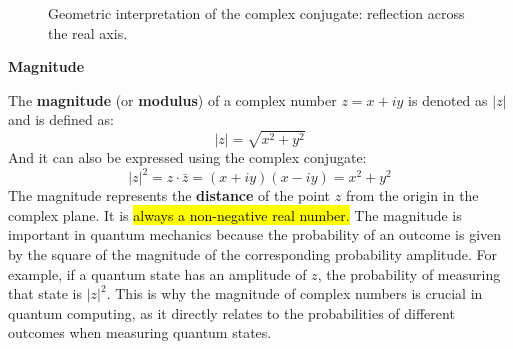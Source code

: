 \begin{figure}[!htp]
    \centering
    \caption{Geometric interpretation of the complex conjugate: reflection across the real axis.}
    \label{fig:complex-conjugate}
\end{figure}

\begin{flushleft}
    \textcolor{Green3}{ \textbf{Magnitude}}\label{sec:magnitude}
\end{flushleft}
The \textbf{magnitude} (or \textbf{modulus}) of a complex number $z = x + iy$ is denoted as $\left|z\right|$ and is defined as:
\begin{equation*}
    \left|z\right| = \sqrt{x^2 + y^2}
\end{equation*}
And it can also be expressed using the complex conjugate:
\begin{equation*}
    \left|z\right|^2 = z \cdot \bar{z} = (x + iy)(x - iy) = x^2 + y^2
\end{equation*}
The magnitude represents the \textbf{distance} of the point $z$ from the origin in the complex plane. It is \hl{always a non-negative real number.} The magnitude is important in quantum mechanics because the probability of an outcome is given by the square of the magnitude of the corresponding probability amplitude. For example, if a quantum state has an amplitude of $z$, the probability of measuring that state is $\left|z\right|^2$. This is why the magnitude of complex numbers is crucial in quantum computing, as it directly relates to the probabilities of different outcomes when measuring quantum states.

